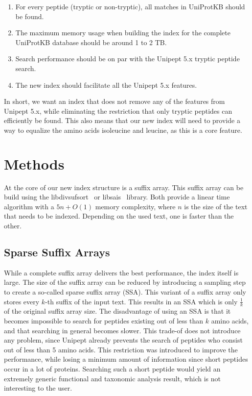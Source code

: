 \documentclass[11pt]{article}
\begin{document}
\begin{multicols}{2}
        \begin{enumerate}
            \item For every peptide (tryptic or non-tryptic), all matches in UniProtKB should be found.
            \item The maximum memory usage when building the index for the complete UniProtKB database should be around 1 to 2 TB\@.
            \item Search performance should be on par with the Unipept 5.x tryptic peptide search.
            \item The new index should facilitate all the Unipept 5.x features.
        \end{enumerate}

        In short, we want an index that does not remove any of the features from Unipept 5.x, while eliminating the restriction that only tryptic peptides can efficiently be found.
        This also means that our new index will need to provide a way to equalize the amino acids isoleucine and leucine, as this is a core feature.


        \section{Methods}\label{sec:methods}
        At the core of our new index structure is a suffix array.
        This suffix array can be build using the libdivsufsort~\cite{libdivsufsort} or libsais~\cite{libsais} library.
        Both provide a linear time algorithm with a $5n + O(1)$ memory complexity, where $n$ is the size of the text that needs to be indexed.
        Depending on the used text, one is faster than the other.

        \subsection{Sparse Suffix Arrays}
        While a complete suffix array delivers the best performance, the index itself is large.
        The size of the suffix array can be reduced by introducing a sampling step to create a so-called sparse suffix array (SSA).
        This variant of a suffix array only stores every $k$-th suffix of the input text.
        This results in an SSA which is only $\frac{1}{k}$ of the original suffix array size.
        The disadvantage of using an SSA is that it becomes impossible to search for peptides existing out of less than $k$ amino acids, and that searching in general becomes slower.
        This trade-of does not introduce any problem, since Unipept already prevents the search of peptides who consist out of less than 5 amino acids.
        This restriction was introduced to improve the performance, while losing a minimum amount of information since short peptides occur in a lot of proteins.
        Searching such a short peptide would yield an extremely generic functional and taxonomic analysis result, which is not interesting to the user.


\end{multicols}
\end{document}
